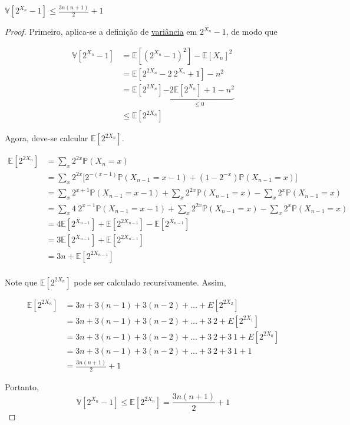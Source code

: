 \begin{lemma} \label{morris:variance}
$\mathbb{V}[2^{X_n} - 1] \leq \frac{3n(n+1)}{2} + 1$
\end{lemma}

\begin{proof}
Primeiro, aplica-se a definição de \hyperref[ap:variance]{variância} em $2^{X_n} - 1$, de modo que

\begin{align*}
  \mathbb{V}[2^{X_n} - 1] 
    &= \mathbb{E}[(2^{X_n} - 1) ^ 2] - \mathbb{E}[X_n]^2  \\
    &= \mathbb{E}[2^{2X_n} -2 \ 2^{X_n} + 1] - n^2 \\
    &= \mathbb{E}[2^{2X_n}] \underbrace{-2 \mathbb{E} [2^{X_n}] + 1 - n^2}_{\leq 0} \\ 
    &\leq \mathbb{E}[2^{2X_n}]
\end{align*}

Agora, deve-se calcular $\mathbb{E}[2^{2X_n}]$.

\begin{align*}
  \mathbb{E}[2^{2X_n}]  
    &=  \sum_{x} 2^{2x} \mathbb{P}(X_n = x) \\
    &=  \sum_{x} 2^{2x} \Big[ 2^{-(x-1)} \mathbb{P}(X_{n-1} = x-1) + (1 - 2^{-x}) \mathbb{P}(X_{n-1} = x) \Big] \\
    &=  \sum_{x} 2^{x+1} \mathbb{P}(X_{n-1} = x-1) + \sum_{x} 2^{2x} \mathbb{P}(X_{n-1} = x) - \sum_{x} 2^{x} \mathbb{P}(X_{n-1} = x) \\
    &=  \sum_{x} 4 \ 2^{x-1} \mathbb{P}(X_{n-1} = x-1) + \sum_{x} 2^{2x} \mathbb{P}(X_{n-1} = x) - \sum_{x} 2^{x} \mathbb{P}(X_{n-1} = x)  \\
    &=  4 \mathbb{E}[2^{X_{n-1}}] + \mathbb{E}[2^{2X_{n-1}}] - \mathbb{E}[2^{X_{n-1}}]  \\
    &=  3 \mathbb{E}[2^{X_{n-1}}] + \mathbb{E}[2^{2X_{n-1}}]  \\
    &=  3 n + \mathbb{E}[2^{2X_{n-1}}]  \\
\end{align*}

Note que $\mathbb{E}[2^{2X_n}]$ pode ser calculado recursivamente. Assim,

\begin{align*}
  \mathbb{E}[2^{2X_{n}}] 
    &= 3n + 3(n-1) + 3(n-2) + \dots + E[2^{2X_2}] \\
    &= 3n + 3(n-1) + 3(n-2) + \dots + 3 \ 2 + E[2^{2X_1}] \\
    &= 3n + 3(n-1) + 3(n-2) + \dots + 3 \ 2 + 3 \ 1 + E[2^{2X_0}] \\
    &= 3n + 3(n-1) + 3(n-2) + \dots + 3 \ 2 + 3 \ 1 + 1 \\
    &= \frac{3n(n+1)}{2} + 1
\end{align*}

Portanto, 
\[ \mathbb{V}[2^{X_n} - 1] \leq \mathbb{E}[2^{2X_n}] = \frac{3n(n+1)}{2} + 1 \]

\end{proof}


